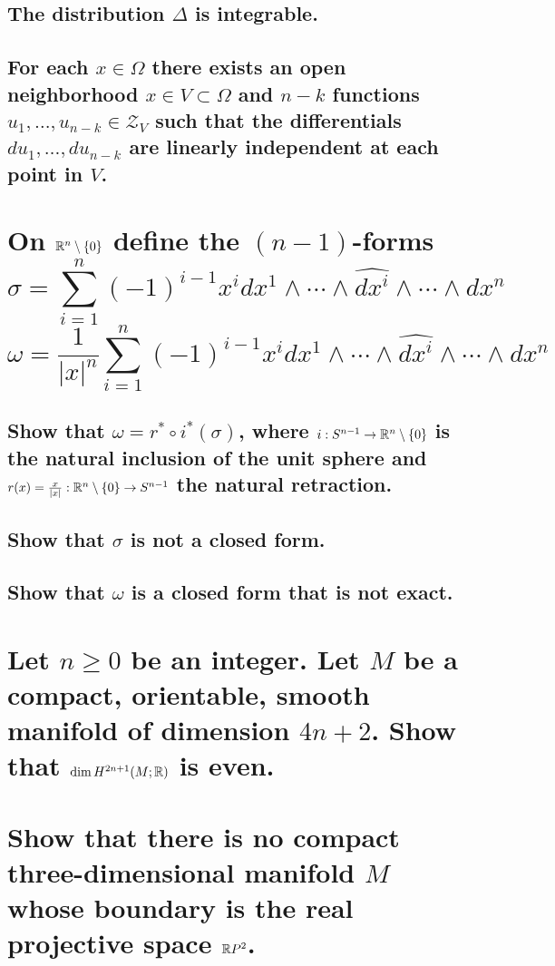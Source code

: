 \documentclass[10pt]{article}
\begin{document}
\subsection{The distribution $\Delta$ is integrable.}

\subsection{For each $x \in \Omega$ there exists an open neighborhood $x \in V \subset \Omega$ and
  $n-k$ functions $u_1, \dots, u_{n-k} \in \mathcal{Z}_V$ such that the differentials $d u_1,
  \dots, d u_{n-k}$ are linearly independent at each point in $V$.}

\section{On $\mathbb{R}^n \setminus \{ 0\}$ define the $(n-1)$-forms
  $$\sigma = \sum_{i=1}^n (-1)^{i-1} x^i dx^1 \wedge \cdots \wedge \widehat{dx^i} \wedge \cdots
  \wedge dx^n$$ 
  $$\omega = \frac{1}{|x|^n}  \sum_{i=1}^n (-1)^{i-1} x^i dx^1 \wedge \cdots \wedge \widehat{dx^i}
  \wedge \cdots \wedge dx^n$$}

\subsection{Show that $\omega = r^* \circ i^*(\sigma)$, where $i: S^{n-1} \to \mathbb{R}^n \setminus
  \{0\}$ is the natural inclusion of the unit sphere and $r(x) = \frac{x}{|x|} : \mathbb{R}^n
  \setminus \{0\} \to S^{n-1}$ the natural retraction.}

\subsection{Show that $\sigma$ is not a closed form.}

\subsection{Show that $\omega$ is a closed form that is not exact.}

\section{Let $n \geq 0$ be an integer. Let $M $ be a compact, orientable, smooth manifold of
  dimension $4n +2$. Show that $\dim H^{2n+1} (M; \mathbb{R})$ is even.}

\section{Show that there is no compact three-dimensional manifold $M$ whose boundary is the real
  projective space $\mathbb{R} P^2$.}
\end{document}
